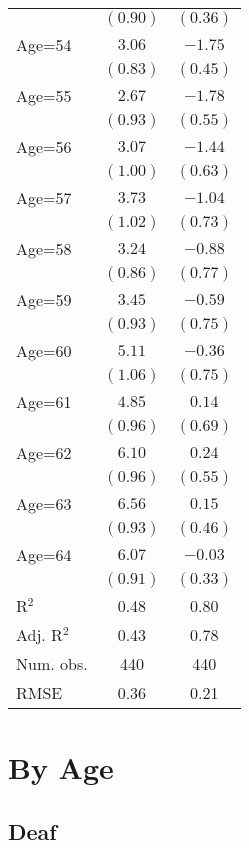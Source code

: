 \documentclass[fullpage]{paper}
\begin{document}
\begin{center}
\begin{longtable}{l c c }
            & $(0.90)$ & $(0.36)$ \\
Age=54      & $3.06$   & $-1.75$  \\
            & $(0.83)$ & $(0.45)$ \\
Age=55      & $2.67$   & $-1.78$  \\
            & $(0.93)$ & $(0.55)$ \\
Age=56      & $3.07$   & $-1.44$  \\
            & $(1.00)$ & $(0.63)$ \\
Age=57      & $3.73$   & $-1.04$  \\
            & $(1.02)$ & $(0.73)$ \\
Age=58      & $3.24$   & $-0.88$  \\
            & $(0.86)$ & $(0.77)$ \\
Age=59      & $3.45$   & $-0.59$  \\
            & $(0.93)$ & $(0.75)$ \\
Age=60      & $5.11$   & $-0.36$  \\
            & $(1.06)$ & $(0.75)$ \\
Age=61      & $4.85$   & $0.14$   \\
            & $(0.96)$ & $(0.69)$ \\
Age=62      & $6.10$   & $0.24$   \\
            & $(0.96)$ & $(0.55)$ \\
Age=63      & $6.56$   & $0.15$   \\
            & $(0.93)$ & $(0.46)$ \\
Age=64      & $6.07$   & $-0.03$  \\
            & $(0.91)$ & $(0.33)$ \\
\hline
R$^2$       & 0.48     & 0.80     \\
Adj. R$^2$  & 0.43     & 0.78     \\
Num. obs.   & 440      & 440      \\
RMSE        & 0.36     & 0.21     \\
\end{longtable}
\end{center}
\section{ By Age }

\subsection{ Deaf }
\end{document}
